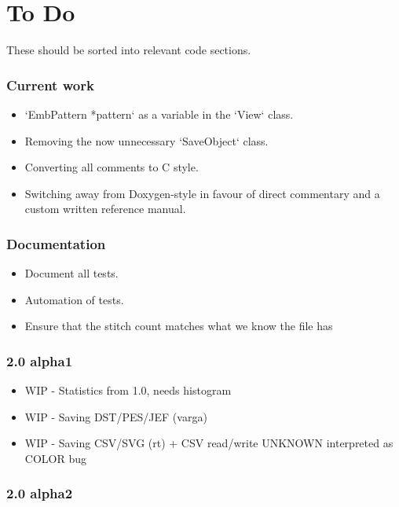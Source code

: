 \documentclass[11pt]{report}
\begin{document}
\chapter{To Do}

These should be sorted into relevant code sections.

\subsection{Current work}

\begin{itemize}
\item `EmbPattern *pattern` as a variable in the `View` class.
\item Removing the now unnecessary `SaveObject` class.
\item Converting all comments to C style.
\item Switching away from Doxygen-style in favour of direct commentary and a custom written reference manual.
\end{itemize}

\subsection{Documentation}

\begin{itemize}
\item Document all tests.
\item Automation of tests.
\item Ensure that the stitch count matches what we know the file has
\end{itemize}

\subsection{2.0 alpha1}

\begin{itemize}
\item WIP - Statistics from 1.0, needs histogram
\item WIP - Saving DST/PES/JEF (varga)
\item WIP - Saving CSV/SVG (rt) + CSV read/write UNKNOWN interpreted as COLOR bug
\end{itemize}

\subsection{2.0 alpha2}
\end{document}
